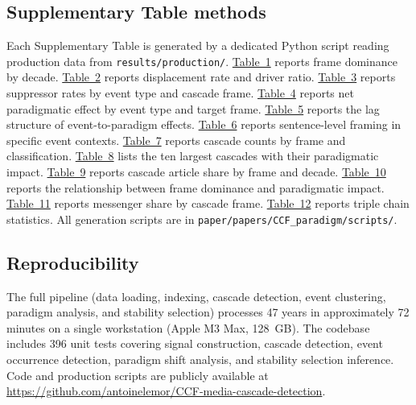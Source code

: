 \subsection*{Supplementary Table methods}

Each Supplementary Table is generated by a dedicated Python script reading production data from \texttt{results/production/}. \hyperref[tab:si_dominance_decades]{Table~1} reports frame dominance by decade. \hyperref[tab:si_displacement]{Table~2} reports displacement rate and driver ratio. \hyperref[tab:si_event_frame]{Table~3} reports suppressor rates by event type and cascade frame. \hyperref[tab:si_paradigm_impact]{Table~4} reports net paradigmatic effect by event type and target frame. \hyperref[tab:si_lag_analysis]{Table~5} reports the lag structure of event-to-paradigm effects. \hyperref[tab:si_sentence_framing]{Table~6} reports sentence-level framing in specific event contexts. \hyperref[tab:si_cascade_class]{Table~7} reports cascade counts by frame and classification. \hyperref[tab:si_largest_cascades]{Table~8} lists the ten largest cascades with their paradigmatic impact. \hyperref[tab:si_cascade_share]{Table~9} reports cascade article share by frame and decade. \hyperref[tab:si_dominance_impact]{Table~10} reports the relationship between frame dominance and paradigmatic impact. \hyperref[tab:si_messenger_share]{Table~11} reports messenger share by cascade frame. \hyperref[tab:si_triple_stats]{Table~12} reports triple chain statistics. All generation scripts are in \texttt{paper/papers/CCF\_paradigm/scripts/}.

\subsection*{Reproducibility}

The full pipeline (data loading, indexing, cascade detection, event clustering, paradigm analysis, and stability selection) processes 47 years in approximately 72 minutes on a single workstation (Apple M3 Max, 128~GB). The codebase includes 396 unit tests covering signal construction, cascade detection, event occurrence detection, paradigm shift analysis, and stability selection inference. Code and production scripts are publicly available at \url{https://github.com/antoinelemor/CCF-media-cascade-detection}.
\endgroup
